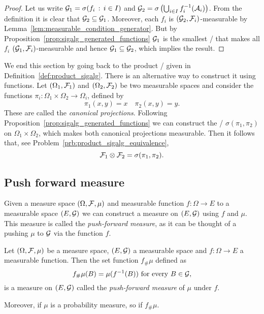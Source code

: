 \begin{proof}
Let us write $\mathcal G_1 = \sigma(f_i \, : \, i \in I)$ and $\mathcal G_2 = \sigma\left(\bigcup_{i \in I} f_i^{-1}(\mathcal A_i)\right)$. From the definition it is clear that $\mathcal G_2 \subseteq \mathcal G_1$. Moreover, each $f_i$ is $(\mathcal G_2, \mathcal F_i)$-measurable by Lemma~\ref{lem:measurable_condition_generator}. But by Proposition~\ref{prop:sigalg_generated_functions} $\mathcal G_1$ is the smallest \sigalg/ that makes all $f_i$ $(\mathcal G_1, \mathcal F_i)$-measurable and hence $\mathcal G_1 \subseteq \mathcal G_2$, which implies the result.
\end{proof}

We end this section by going back to the product \sigalg/ given in Definition~\ref{def:product_sigalg}. There is an alternative way to construct it using functions. Let $(\Omega_1, \mathcal F_1)$ and $(\Omega_2, \mathcal F_2)$ be two measurable spaces and consider the functions $\pi_i : \Omega_1 \times \Omega_2 \to \Omega_i$, defined by 
\[
	\pi_1(x,y) = x \quad \pi_2(x,y) = y.
\]
These are called the \emph{canonical projections}. Following Proposition~\ref{prop:sigalg_generated_functions} we can construct the \sigalg/ $\sigma(\pi_1, \pi_2)$ on $\Omega_1 \times \Omega_2$, which makes both canonical projections measurable. Then it follows that, see Problem~\ref{prb:product_sigalg_equivalence},
\begin{equation}\label{eq:product_sigalg_equivalence}
	\mathcal F_1 \otimes \mathcal F_2 = \sigma(\pi_1, \pi_2).
\end{equation}

\subsection{Push forward measure}

Given a measure space $(\Omega, \mathcal F, \mu)$ and measurable function $f : \Omega \to E$ to a measurable space $(E,\mathcal G)$ we can construct a measure on $(E,\mathcal G)$ using $f$ and $\mu$. This measure is called the \emph{push-forward measure}, as it can be thought of a pushing $\mu$ to $\mathcal G$ via the function $f$.

\begin{proposition}\label{prop:push_forward_measure}
Let $(\Omega, \mathcal F, \mu)$ be a measure space, $(E, \mathcal G)$ a measurable space and $f : \Omega \to E$ a measurable function. Then the set function $f_\# \mu$ defined as
\[
	f_\# \mu (B) = \mu(f^{-1}(B)) \text{ for every } B \in \mathcal G,
\]
is a measure on $(E, \mathcal G)$ called the \emph{push-forward measure} of $\mu$ under $f$.

Moreover, if $\mu$ is a probability measure, so if $f_\# \mu$.
\end{proposition}

